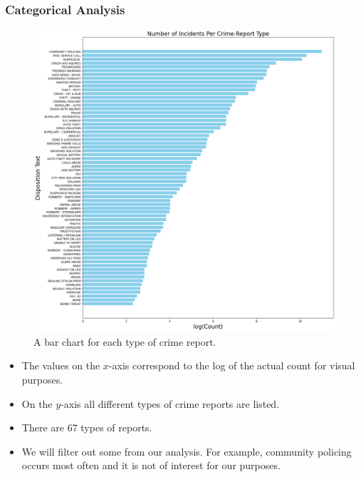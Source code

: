 \documentclass{beamer}
\begin{document}
\begin{frame}
    \frametitle{Categorical Analysis}
    \begin{minipage}[c]{0.65\textwidth}
        \begin{figure}
            \centering
            \includegraphics[width=\linewidth]{Figures/Number of Incidents Per Crime-Report Type.png}
            \caption{A bar chart for each type of crime report.}
        \end{figure}
    \end{minipage}\hfill
    \begin{minipage}[c]{0.3\textwidth}
        {\scriptsize %
            \begin{itemize}
                \item The values on the $x$-axis correspond to the log of the actual count for visual purposes.
                \item On the $y$-axis all different types of crime reports are listed.
                \item There are 67 types of reports.
                \item We will filter out some from our analysis. For example, community policing occurs most often and it is not of interest for our purposes.
            \end{itemize}
        }
    \end{minipage}
\end{frame}
\end{document}
